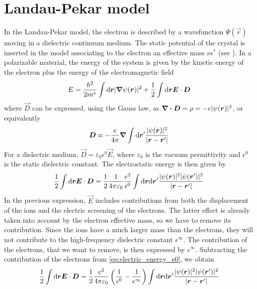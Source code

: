 \section{Landau-Pekar model} \label{sec:landau_pekar}
In the Landau-Pekar model, the electron is described by a wavefunction $\Psi(\vec{r})$ moving in a dielectric continuum medium. The static potential of the crystal is inserted in the model associating to the electron an effective mass $m^*$ (see ). In a polarizable material, the energy of the system is given by the kinetic energy of the electron plus the energy of the electromagnetic field
\begin{equation} \label{eq:energy_landau}
    E = \frac{\hslash^2}{2m^*} \int \differential\vec{r} |\grad \psi(\vec{r})|^2 + \oh \int \differential \vec{r} \vec{E}\cdot \vec{D}
\end{equation}
where $\vec{D}$ can be expressed, using the Gauss law, as $\div\mathbf{\boldsymbol{D}} = \rho = -e |\psi(\mathbf{\boldsymbol{r}})|^2$, or equivalently
\begin{equation}
    \vec{D} = -\frac{e}{4\pi} \grad \int \differential \vec{r}' \frac{|\psi(\vec{r})|^2}{|\vec{r}-\vec{r}'|}
\end{equation}
For a dielectric medium, $\vec{D} = \varepsilon_0 \epsilon^0 \vec{E}$, where $\varepsilon_0$ is the vacuum permittivity and $\epsilon^0$ is the static dielectric constant. The electrostatic energy is then given by
\begin{equation} \label{eq:electric_energy_e0}
    \oh \int \differential \vec{r}  \vec{E}\cdot \vec{D} =
    \oh \frac{1}{4\pi\varepsilon_0} \frac{e^2}{\epsilon^0} \int \differential \vec{r} \differential \vec{r}' \frac{|\psi(\vec{r})|^2|\psi(\vec{r}')|^2}{|\vec{r}-\vec{r}'|}
\end{equation}
In the previous expression, $\vec{E}$ includes contributions from both the displacement of the ions and the electric screening of the electrons. The latter effect is already taken into account by the electron effective mass, so we have to remove its contribution. Since the ions have a much larger mass than the electrons, they will not contribute to the high-frequency dielectric constant $\epsilon^\infty$. The contribution of the electrons, that we want to remove, is then expressed by $\epsilon^\infty$. Subtracting the contribution of the electrons from \cref{eq:electric_energy_e0}, we obtain
\begin{equation}
    \oh \int \differential \vec{r} \vec{E}\cdot \vec{D} =
    \oh \frac{e^2}{4\pi\varepsilon_0} \left( \frac{1}{\epsilon^0} - \frac{1}{\epsilon^\infty} \right) \int \differential \vec{r} \differential \vec{r}' \frac{|\psi(\vec{r})|^2|\psi(\vec{r}')|^2}{|\vec{r}-\vec{r}'|}
\end{equation}
